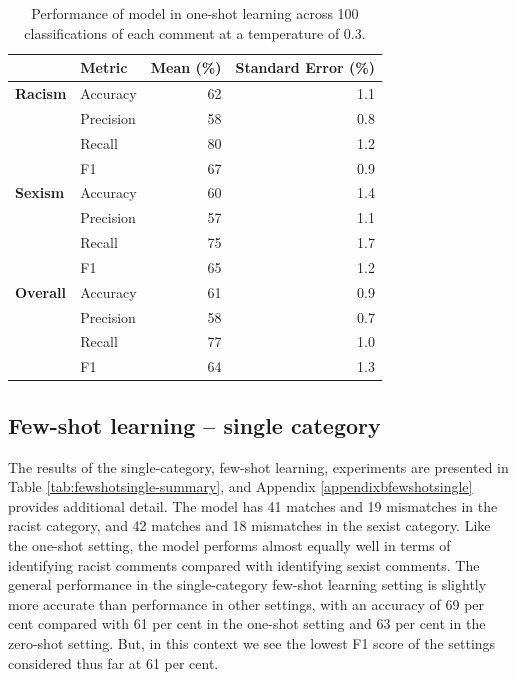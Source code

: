 \documentclass[12pt,]{article}
\begin{document}
\begin{table}

\caption{\label{tab:oneshot-summary}Performance of model in one-shot learning across 100 classifications of each comment at a temperature of 0.3.}
\centering
\begin{tabular}[t]{>{}llrr}
\toprule
 & Metric & Mean (\%) & Standard Error (\%)\\
\midrule
\textbf{Racism} & Accuracy & 62 & 1.1\\
\textbf{} & Precision & 58 & 0.8\\
\textbf{} & Recall & 80 & 1.2\\
\textbf{} & F1 & 67 & 0.9\\
\textbf{Sexism} & Accuracy & 60 & 1.4\\
\textbf{} & Precision & 57 & 1.1\\
\textbf{} & Recall & 75 & 1.7\\
\textbf{} & F1 & 65 & 1.2\\
\textbf{Overall} & Accuracy & 61 & 0.9\\
\textbf{} & Precision & 58 & 0.7\\
\textbf{} & Recall & 77 & 1.0\\
\textbf{} & F1 & 64 & 1.3\\
\bottomrule
\end{tabular}
\end{table}

\hypertarget{few-shot-learning-single-category}{%
\subsection{Few-shot learning -- single category}\label{few-shot-learning-single-category}}

The results of the single-category, few-shot learning, experiments are presented in Table \ref{tab:fewshotsingle-summary}, and Appendix \ref{appendixbfewshotsingle} provides additional detail. The model has 41 matches and 19 mismatches in the racist category, and 42 matches and 18 mismatches in the sexist category. Like the one-shot setting, the model performs almost equally well in terms of identifying racist comments compared with identifying sexist comments. The general performance in the single-category few-shot learning setting is slightly more accurate than performance in other settings, with an accuracy of 69 per cent compared with 61 per cent in the one-shot setting and 63 per cent in the zero-shot setting. But, in this context we see the lowest F1 score of the settings considered thus far at 61 per cent.
\end{document}
